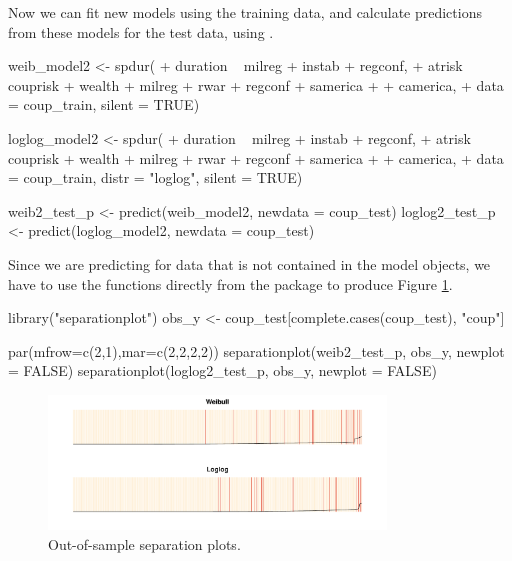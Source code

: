 
Now we can fit new models using the training data, and calculate
predictions from these models for the test data, using
.

\begin{example}
  weib_model2   <- spdur(
  +    duration ~ milreg + instab + regconf,
  +    atrisk ~ couprisk + wealth + milreg + rwar + regconf + samerica + 
  +      camerica,
  +    data = coup_train, silent = TRUE)

  loglog_model2 <- spdur(
  +    duration ~ milreg + instab + regconf,
  +    atrisk ~ couprisk + wealth + milreg + rwar + regconf + samerica + 
  +      camerica,
  +    data = coup_train, distr = "loglog", silent = TRUE) 
\end{example}

\begin{example}
  weib2_test_p   <- predict(weib_model2, newdata = coup_test)
  loglog2_test_p <- predict(loglog_model2, newdata = coup_test)
\end{example}

Since we are predicting for data that is not contained in the 
model objects, we have to use the  functions
directly from the package to produce Figure \ref{oos-sepplots}.

\begin{example}
  library("separationplot")
  obs_y <- coup_test[complete.cases(coup_test), "coup"]

  par(mfrow=c(2,1),mar=c(2,2,2,2))
  separationplot(weib2_test_p,   obs_y, newplot = FALSE)
  separationplot(loglog2_test_p, obs_y, newplot = FALSE)
\end{example}

\begin{figure}[htbp!]
\begin{center}
\includegraphics[width=0.8\textwidth]{graphics/oos-sepplots.pdf}
\caption{Out-of-sample separation plots.}
\label{oos-sepplots}
\end{center}
\end{figure}

